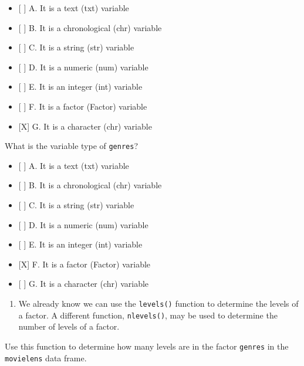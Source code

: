 \documentclass[]{article}
\newenvironment{Shaded}{\begin{snugshade}}{\end{snugshade}}
\newcommand{\KeywordTok}[1]{\textcolor[rgb]{0.13,0.29,0.53}{\textbf{#1}}}
\newcommand{\NormalTok}[1]{#1}
\newcommand{\OperatorTok}[1]{\textcolor[rgb]{0.81,0.36,0.00}{\textbf{#1}}}
\providecommand{\tightlist}{%
  \setlength{\itemsep}{0pt}\setlength{\parskip}{0pt}}
\begin{document}
\begin{itemize}
\tightlist
\item
  {[} {]} A. It is a text (txt) variable
\item
  {[} {]} B. It is a chronological (chr) variable
\item
  {[} {]} C. It is a string (str) variable
\item
  {[} {]} D. It is a numeric (num) variable
\item
  {[} {]} E. It is an integer (int) variable
\item
  {[} {]} F. It is a factor (Factor) variable
\item
  {[}X{]} G. It is a character (chr) variable
\end{itemize}

What is the variable type of \texttt{genres}?

\begin{itemize}
\tightlist
\item
  {[} {]} A. It is a text (txt) variable
\item
  {[} {]} B. It is a chronological (chr) variable
\item
  {[} {]} C. It is a string (str) variable
\item
  {[} {]} D. It is a numeric (num) variable
\item
  {[} {]} E. It is an integer (int) variable
\item
  {[}X{]} F. It is a factor (Factor) variable
\item
  {[} {]} G. It is a character (chr) variable
\end{itemize}

\begin{enumerate}
\def\labelenumi{\arabic{enumi}.}
\setcounter{enumi}{3}
\tightlist
\item
  We already know we can use the \texttt{levels()} function to determine
  the levels of a factor. A different function, \texttt{nlevels()}, may
  be used to determine the number of levels of a factor.
\end{enumerate}

Use this function to determine how many levels are in the factor
\texttt{genres} in the \texttt{movielens} data frame.

\begin{Shaded}
\end{Shaded}
\end{document}
